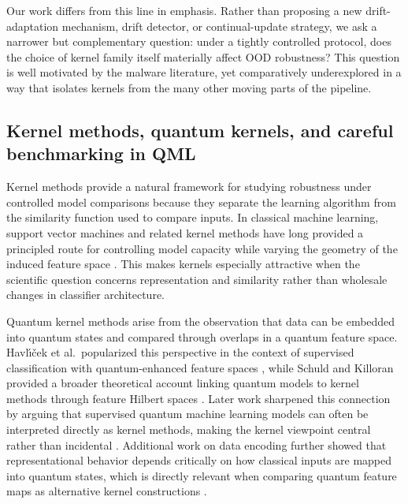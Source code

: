 \documentclass[pdflatex,sn-mathphys-num]{sn-jnl}%
\theoremstyle{thmstyleone}%
\theoremstyle{thmstyletwo}%
\theoremstyle{thmstylethree}%
\begin{document}
Our work differs from this line in emphasis. Rather than proposing a new drift-adaptation mechanism, drift detector, or continual-update strategy, we ask a narrower but complementary question: under a tightly controlled protocol, does the choice of kernel family itself materially affect OOD robustness? This question is well motivated by the malware literature, yet comparatively underexplored in a way that isolates kernels from the many other moving parts of the pipeline.

\subsection{Kernel methods, quantum kernels, and careful benchmarking in QML}

Kernel methods provide a natural framework for studying robustness under controlled model comparisons because they separate the learning algorithm from the similarity function used to compare inputs. In classical machine learning, support vector machines and related kernel methods have long provided a principled route for controlling model capacity while varying the geometry of the induced feature space \cite{cortes1995svm,scholkopf2002learningwithkernels}. This makes kernels especially attractive when the scientific question concerns representation and similarity rather than wholesale changes in classifier architecture.

Quantum kernel methods arise from the observation that data can be embedded into quantum states and compared through overlaps in a quantum feature space. Havl{\'\i}{\v{c}}ek et al.\ popularized this perspective in the context of supervised classification with quantum-enhanced feature spaces \cite{havlicek2019quantumenhanced}, while Schuld and Killoran provided a broader theoretical account linking quantum models to kernel methods through feature Hilbert spaces \cite{schuld2019featurehilbert}. Later work sharpened this connection by arguing that supervised quantum machine learning models can often be interpreted directly as kernel methods, making the kernel viewpoint central rather than incidental \cite{schuld2021kernelmethods}. Additional work on data encoding further showed that representational behavior depends critically on how classical inputs are mapped into quantum states, which is directly relevant when comparing quantum feature maps as alternative kernel constructions \cite{schuld2021encoding}.
\end{document}
